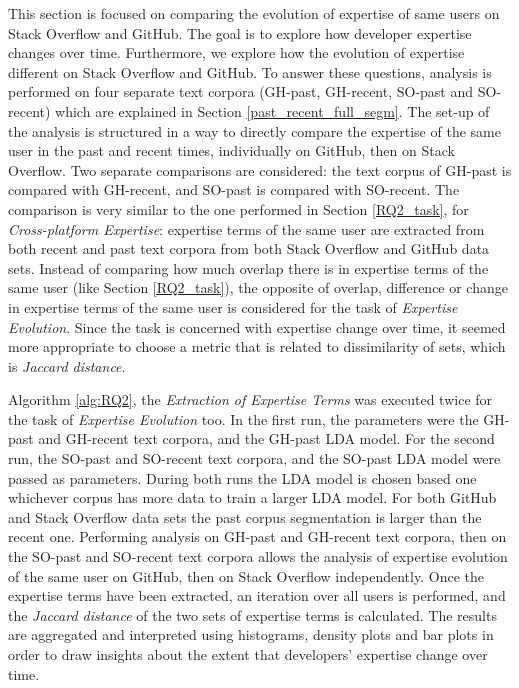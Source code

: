         This section is focused on comparing the evolution of expertise of same users on Stack Overflow and GitHub. The goal is to explore how developer expertise changes over time. Furthermore, we explore how the evolution of expertise different on Stack Overflow and GitHub. To answer these questions, analysis is performed on four separate text corpora (GH-past, GH-recent, SO-past and SO-recent) which are explained in Section \ref{past_recent_full_segm}. The set-up of the analysis is structured in a way to directly compare the expertise of the same user in the past and recent times, individually on GitHub, then on Stack Overflow. Two separate comparisons are considered: the text corpus of GH-past is compared with GH-recent, and SO-past is compared with SO-recent. The comparison is very similar to the one performed in Section \ref{RQ2_task}, for \emph{Cross-platform Expertise}: expertise terms of the same user are extracted from both recent and past text corpora from both Stack Overflow and GitHub data sets. Instead of comparing how much overlap there is in expertise terms of the same user (like Section \ref{RQ2_task}), the opposite of overlap, difference or change in expertise terms of the same user is considered for the task of \emph{Expertise Evolution}. Since the task is concerned with expertise change over time, it seemed more appropriate to choose a metric that is related to dissimilarity of sets, which is  \emph{Jaccard distance}.
        
        Algorithm \ref{alg:RQ2}, the \emph{Extraction of Expertise Terms} was executed twice for the task of \emph{Expertise Evolution} too. In the first run, the parameters were the GH-past and GH-recent text corpora, and the GH-past LDA model. For the second run, the SO-past and SO-recent text corpora, and the SO-past LDA model were passed as parameters. During both runs the LDA model is chosen based one whichever corpus has more data to train a larger LDA model. For both GitHub and Stack Overflow data sets the past corpus segmentation is larger than the recent one. Performing analysis on GH-past and GH-recent text corpora, then on the SO-past and SO-recent text corpora allows the analysis of expertise evolution of the same user on GitHub, then on Stack Overflow independently. Once the expertise terms have been extracted, an iteration over all users is performed, and the \emph{Jaccard distance} of the two sets of expertise terms is calculated. The results are aggregated and interpreted using histograms, density plots and bar plots in order to draw insights about the extent that developers' expertise change over time.

